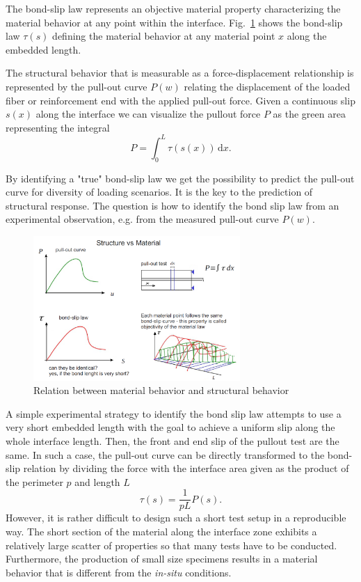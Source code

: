 \documentclass[main.tex]{subfiles}
\begin{document}
The bond-slip law represents an objective material property characterizing the material behavior at any point within the interface. 
Fig.~\ref{FIGDrawingStructureMaterial} shows the bond-slip law $\tau(s)$ defining the material behavior at any material point $x$ along the embedded length. 

The structural behavior that is measurable as a force-displacement relationship is represented by the  pull-out curve  $P(w)$ relating 
the displacement of the loaded fiber or reinforcement end with the applied pull-out force.
Given a continuous slip $s(x)$ along the interface we can visualize the pullout force $P$ as the green area representing the integral 
\[
P = \int_{0}^{L} \tau(s(x)) \, \mathrm{d}x.
\]

By identifying a "true" bond-slip law we get the possibility to predict the pull-out curve for diversity of loading scenarios. It is the key to the prediction of structural response. The question is how to identify the bond slip law from an experimental observation, e.g. from the measured pull-out curve $P(w)$.

\begin{figure}[ht]
	\centering
  \includegraphics[width=0.7\textwidth]{drawings/structure_versus_material.png}
	\caption{Relation between material behavior and structural behavior}
	\label{FIGDrawingStructureMaterial}
\end{figure}

A simple experimental strategy to identify the bond slip law attempts to use a very short embedded length with the goal to achieve a uniform slip along the whole interface length. Then, the front and end slip of the pullout test are the same. In such a case, the pull-out curve can be directly transformed to the bond-slip relation by dividing the force with the interface area given as the product of the perimeter $p$ and length $L$ 
\[
\tau(s) =  \frac{1}{pL} P(s).
\]
However, it is rather difficult to design such a short test setup in a reproducible way. The short section of the material along the interface zone exhibits a relatively large scatter of properties so that many tests have to be conducted. Furthermore, the production of small size specimens results in a material behavior that is different from the \textit{in-situ} conditions. 
\end{document}
